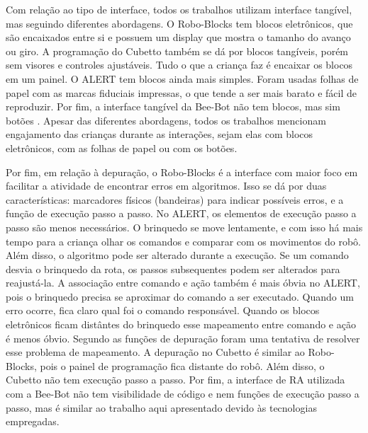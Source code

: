 Com relação ao tipo de interface, todos os trabalhos utilizam interface tangível, mas seguindo diferentes abordagens. O Robo-Blocks tem blocos eletrônicos, que são encaixados entre si e possuem um display que mostra o tamanho do avanço ou giro. A programação do Cubetto também se dá por blocos tangíveis, porém sem visores e controles ajustáveis. Tudo o que a criança faz é encaixar os blocos em um painel. O ALERT tem blocos ainda mais simples. Foram usadas folhas de papel com as marcas fiduciais impressas, o que tende a ser mais barato e fácil de reproduzir. Por fim, a interface tangível da Bee-Bot não tem blocos, mas sim botões  \cite{yu_review_2019}. Apesar das diferentes abordagens, todos os trabalhos mencionam engajamento das crianças durante as interações, sejam elas com blocos eletrônicos, com as folhas de papel ou com os botões.

Por fim, em relação à depuração, o Robo-Blocks é a interface com maior foco em facilitar a atividade de encontrar erros em algoritmos. Isso se dá por duas características: marcadores físicos (bandeiras) para indicar possíveis erros, e a função de execução passo a passo.
No ALERT, os elementos de execução passo a passo são menos necessários. O brinquedo se move lentamente, e com isso há mais tempo para a criança olhar os comandos e comparar com os movimentos do robô. Além disso, o algoritmo pode ser alterado durante a execução. Se um comando desvia o brinquedo da rota, os passos subsequentes podem ser alterados para reajustá-la. A associação entre comando e ação também é mais óbvia no ALERT, pois o brinquedo precisa se aproximar do comando a ser executado. Quando um erro ocorre, fica claro qual foi o comando responsável. Quando os blocos eletrônicos ficam distântes do brinquedo esse mapeamento entre comando e ação é menos óbvio. Segundo   as funções de depuração foram uma tentativa de resolver esse problema de mapeamento. A depuração no Cubetto é similar ao Robo-Blocks, pois o painel de programação fica distante do robô. Além disso, o Cubetto não tem execução passo a passo. Por fim, a interface de RA utilizada com a Bee-Bot  \cite{beraza_soft_2010} não tem visibilidade de código e nem funções de execução passo a passo, mas é similar ao trabalho aqui apresentado devido às tecnologias empregadas.

